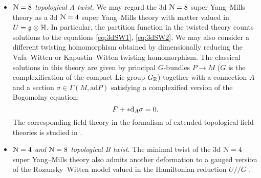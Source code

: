 \documentclass[10pt, oneside]{article}
\newcommand{\ham}{/\!\!/}
\begin{document}
\begin{itemize}
\item \emph{$\mathcal N=8$ topological A twist.} We may regard the 3d $\mathcal N=8$ super Yang--Mills theory as a 3d $\mathcal N=4$ super Yang--Mills theory with matter valued in $U=\mathfrak g\otimes\mathbb{H}$. In particular, the partition function in the twisted theory counts solutions to the equations \eqref{eq:3dSW1}, \eqref{eq:3dSW2}. We may also consider a different twisting homomorphism obtained by dimensionally reducing the Vafa--Witten or Kapustin--Witten twisting homomorphism. The classical solutions in this theory are given by principal $G$-bundles $P\rightarrow M$ ($G$ is the complexification of the compact Lie group $G_\mathbb R$) together with a connection $A$ and a section $\sigma\in\Gamma(M, \mathrm{ad} P)$ satisfying a complexified version of the Bogomolny equation:
\[
F + \ast {\rm d}_A \sigma = 0.
\]
The corresponding field theory in the formalism of extended topological field theories is studied in \cite{BZGN}.

 \item \emph{$\mathcal{N}=4$ and $\mathcal{N}=8$ topological B twist.} The minimal twist of the 3d $\mathcal N=4$ super Yang--Mills theory also admits another deformation to a gauged version of the Rozansky--Witten model valued in the Hamiltonian reduction $U\ham G$ \cite{RozanskyWitten,BlauThompson2}.
 \end{itemize}
\end{document}
